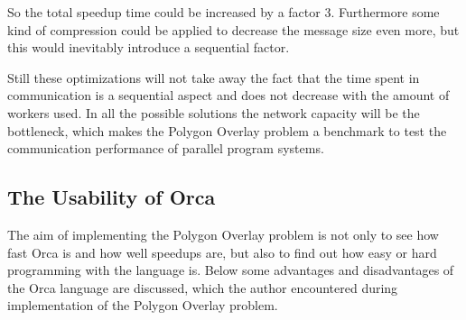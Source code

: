 So the total speedup time could be increased by a factor 3.
Furthermore some kind of compression could be applied to decrease the
message size even more, but this would inevitably introduce a
sequential factor.

Still these optimizations will not take away the fact that the time
spent in communication is a sequential aspect and does not decrease
with the amount of workers used.
In all the possible solutions the network capacity will be the
bottleneck, which makes the Polygon Overlay problem a benchmark to
test the communication performance of parallel program systems.



\subsection {The Usability of Orca}

The aim of implementing the Polygon Overlay problem is not only to
see how fast Orca is and how well speedups are, but also to find out
how easy or hard programming with the language is.
Below some advantages and disadvantages of the Orca language are
discussed, which the author encountered during implementation of the
Polygon Overlay problem.


